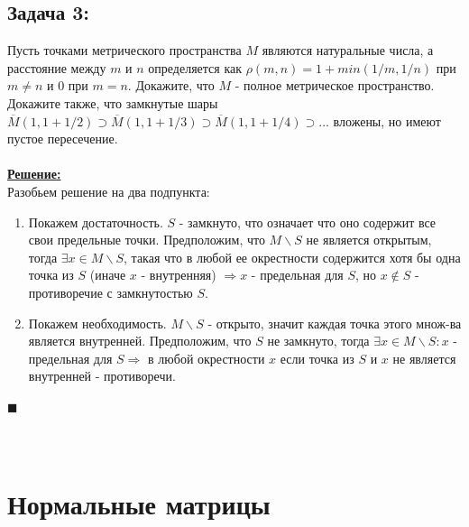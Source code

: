\documentclass[a4paper,12pt,titlepage,final]{article}
\begin{document}
\subsection*{Задача 3:}
\noindent Пусть точками метрического пространства $M$ являются натуральные числа, а расстояние между $m$ и $n$ определяется как $\rho(m, n) = 1 + min(1/m, 1/n)$ при $m \not= n$ и $0$ при $m = n$. Докажите, что $M$ - полное метрическое пространство. Докажите также, что замкнутые шары $
\overline{M}(1, 1 + 1/2) \supset \overline{M}(1, 1 + 1/3) \supset \overline{M}(1, 1 + 1/4) \supset ...$ вложены, но имеют пустое пересечение. \\ \\
\textbf{\underline{Решение:}} \\
Разобьем решение на два подпункта:
\begin{enumerate}
    \item Покажем достаточность. $S$ - замкнуто, что означает что оно содержит все свои предельные точки. Предположим, что $M\backslash S$ не является открытым, тогда $\exists x \in M\backslash S$, такая что в любой ее окрестности содержится хотя бы одна точка из $S$ (иначе $x$ - внутренняя) $\Rightarrow x$ - предельная для $S$, но $x \not\in S$ - противоречие с замкнутостью $S$. 
    \item Покажем необходимость. $M\backslash S$ - открыто, значит каждая точка этого множ-ва является внутренней. Предположим, что $S$ не замкнуто, тогда $\exists x \in M\backslash S : x$ - предельная для $S \Rightarrow$ в любой окрестности $x$ если точка из $S$ и $x$ не является внутренней - противоречи.
\end{enumerate}
$\blacksquare$ \\ \\ \\

\newpage
\section*{Нормальные матрицы}

\end{document}
